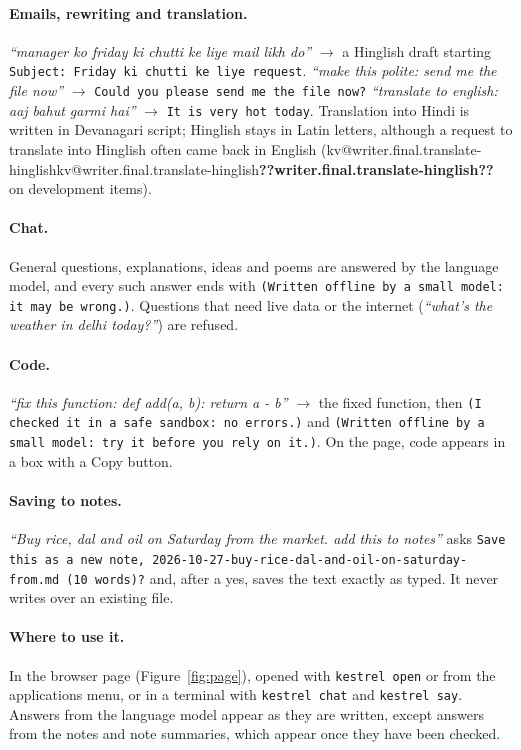 \documentclass[11pt,a4paper]{article}
\makeatletter
\DeclareRobustCommand{\kv}[1]{\ifcsname kv@#1\endcsname\csname kv@#1\endcsname\else\textbf{??#1??}\fi}
\newcommand{\req}[1]{\textit{``#1''}}
\newcommand{\ans}[1]{\texttt{\small #1}}
\makeatother
\begin{document}
\paragraph{Emails, rewriting and translation.} \req{manager ko friday ki chutti ke liye mail likh do} $\to$ a Hinglish
draft starting \ans{Subject: Friday ki chutti ke liye request}. \req{make this polite: send me the file now} $\to$
\ans{Could you please send me the file now?} \req{translate to english: aaj bahut garmi hai} $\to$ \ans{It is very hot
today}. Translation into Hindi is written in Devanagari script; Hinglish stays in Latin letters, although a
request to translate into Hinglish often came back in English (\kv{writer.final.translate-hinglish} on development
items).

\paragraph{Chat.} General questions, explanations, ideas and poems are answered by the language model, and every such
answer ends with \ans{(Written offline by a small model: it may be wrong.)}. Questions that need live data or the
internet (\req{what's the weather in delhi today?}) are refused.

\paragraph{Code.} \req{fix this function: def add(a, b): return a - b} $\to$ the fixed function, then \ans{(I checked it
in a safe sandbox: no errors.)} and \ans{(Written offline by a small model: try it before you rely on it.)}. On the page,
code appears in a box with a Copy button.

\paragraph{Saving to notes.} \req{Buy rice, dal and oil on Saturday from the market. add this to notes} asks
\ans{Save this as a new note, 2026-10-27-buy-rice-dal-and-oil-on-saturday-from.md (10 words)?} and, after a yes, saves
the text exactly as typed. It never writes over an existing file.

\paragraph{Where to use it.} In the browser page (Figure~\ref{fig:page}), opened with \texttt{kestrel open} or from the
applications menu, or in a terminal with \texttt{kestrel chat} and \texttt{kestrel say}. Answers from the language model
appear as they are written, except answers from the notes and note summaries, which appear once they have been checked.
\end{document}
